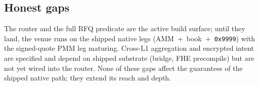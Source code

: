 \subsection{Honest gaps}

The router and the full RFQ predicate are the active build surface; until
they land, the venue runs on the shipped native legs (AMM~+~book~+~\texttt{0x9999})
with the signed-quote PMM leg maturing. Cross-L1 aggregation and encrypted
intent are specified and depend on shipped substrate (bridge, FHE
precompile) but are not yet wired into the router. None of these gaps affect
the guarantees of the shipped native path; they extend its reach and depth.
